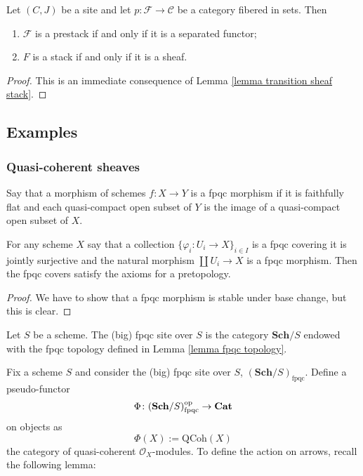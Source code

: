 \begin{refsection}
\begin{prop}
Let $(C,J)$ be a site and let $p \colon \mathcal F \to \mathcal C$ be a category fibered in sets. Then
\begin{enumerate}
\item $\mathcal F$ is a prestack if and only if it is a separated functor;
\item $F$ is a stack if and only if it is a sheaf.
\end{enumerate}
\end{prop}

\begin{proof}
This is an immediate consequence of Lemma \ref{lemma transition sheaf stack}.
\end{proof}

\subsection{Examples}

\subsubsection{Quasi-coherent sheaves}

\begin{defin}
Say that a morphism of schemes $f \colon X \to Y$ is a fpqc morphism if it is faithfully flat and each quasi-compact open subset of $Y$ is the image of a quasi-compact open subset of $X$.
\end{defin}

\begin{lemma} \label{lemma fpqc topology}
For any scheme $X$ say that a collection $\{\varphi_i \colon U_i \to X\}_{i \in I}$ is a fpqc covering it is jointly surjective and the natural morphism $\coprod U_i \to X$ is a fpqc morphism. Then the fpqc covers satisfy the axioms for a pretopology.
\end{lemma}

\begin{proof}
We have to show that a fpqc morphism is stable under base change, but this is clear.
\end{proof}

\begin{defin}
Let $S$ be a scheme. The (big) fpqc site over $S$ is the category $\mathbf{Sch} / S$ endowed with the fpqc topology defined in Lemma \ref{lemma fpqc topology}.
\end{defin}

Fix a scheme $S$ and consider the (big) fpqc site over $S$, $(\mathbf{Sch}/S)_{\mathrm{fpqc}}$. Define a pseudo-functor
\[
\Phi \colon (\mathbf{Sch}/S)_{\mathrm{fpqc}}^{\mathrm{op}} \to \mathbf{Cat}
\]
on objects as
\[
\Phi(X) := \mathrm{QCoh}(X)
\]
the category of quasi-coherent $\mathcal O_X$-modules. To define the action on arrows, recall the following lemma:


\end{refsection}
